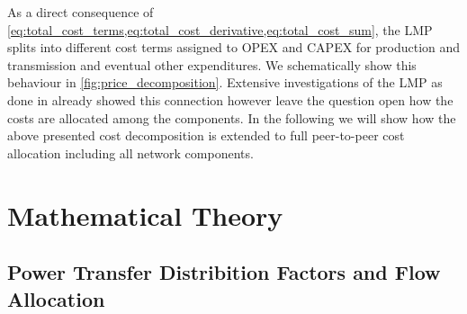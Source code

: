 \documentclass[11pt,twocolumn]{article}
\begin{document}
% 
As a direct consequence of \cref{eq:total_cost_terms,eq:total_cost_derivative,eq:total_cost_sum}, the LMP splits into different cost terms assigned to OPEX and CAPEX for production and transmission and eventual other expenditures. We schematically show this behaviour in \cref{fig:price_decomposition}. 
Extensive investigations of the LMP as done in \cite{schweppe_spot_1988} already showed this connection however leave the question open how the costs are allocated among the components. In the following we will show how the above presented cost decomposition is extended to full peer-to-peer cost allocation including all network components. 



\section{Mathematical Theory}



\subsection{Power Transfer Distribition Factors and Flow Allocation}
\end{document}
